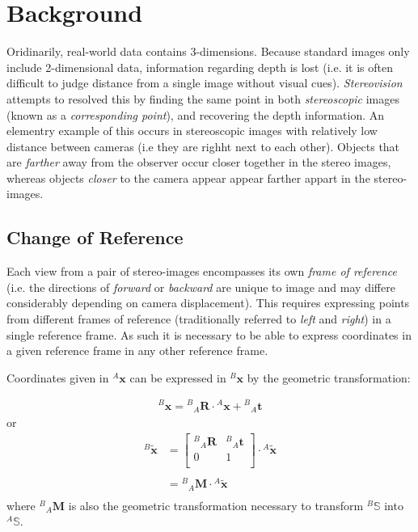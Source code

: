 \documentclass[12pt]{report}
\newcommand{\tR}[0]{\ensuremath{^{A}}}
\newcommand{\bR}[0]{\ensuremath{_{A}}}
\newcommand{\tL}[0]{\ensuremath{^{B}}}
\newcommand{\rL}[0]{\ensuremath{{\tL\bR}}}
\newcommand{\xL}[0]{\ensuremath{{\tL\mathbf{x}}}}
\newcommand{\xR}[0]{\ensuremath{{\tR\mathbf{x}}}}
\newcommand{\hxL}[0]{\ensuremath{{\tL\tilde{\mathbf{x}}}}}
\newcommand{\hxR}[0]{\ensuremath{{\tR\tilde{\mathbf{x}}}}}
\newcommand{\rLM}[0]{\ensuremath{{\tL\bR}\mathbf{M}}}
\newcommand{\rLR}[0]{\ensuremath{{\tL\bR}\mathbf{R}}}
\newcommand{\rLt}[0]{\ensuremath{{\tL\bR}\mathbf{t}}}
\newcommand{\sR}[0]{\ensuremath{^{A}\mathbb{S}}}
\newcommand{\sL}[0]{\ensuremath{^{B}\mathbb{S}}}
\begin{document}
\chapter{Background}

\par Oridinarily, real-world data contains 3-dimensions. 
Because standard images only include 2-dimensional data, information regarding depth is lost (i.e. it is often difficult to judge distance from a single image without visual cues). 
\textit{Stereovision} attempts to resolved this by finding the same point in both \textit{stereoscopic} images (known as a \textit{corresponding point}), and recovering the depth information.
An elementry example of this occurs in stereoscopic images with relatively low distance between cameras (i.e they are righht next to each other). 
Objects that are \textit{farther} away from the observer occur closer together in the stereo images, whereas objects \textit{closer} to the camera appear appear farther appart in the stereo-images.

\section{Change of Reference}

\par Each view from a pair of stereo-images encompasses its own \textit{frame of reference} (i.e. the directions of \textit{forward} or \textit{backward} are unique to image and may differe considerably depending on camera displacement).
This requires expressing points from different frames of reference (traditionally referred to \textit{left} and \textit{right}) in a single reference frame. 
As such it is necessary to be able to express coordinates in a given reference frame in any other reference frame.

\par Coordinates given in $\xR$ can be expressed in $\xL$ by the geometric transformation:
\renewcommand{\arraystretch}{1.5}
\par
\begin{align*}
	\xL = \rLR \cdot \xR + \rLt
\end{align*}
or
\begin{align*}
	\hxL &=
	\left[\begin{array}{c|c}
		\rL\textbf{R} & \rL\textbf{t} \\\hline
		0 & 1 \\
	\end{array}\right]
	\cdot\hxR \\
	&\\
	&= \rLM\cdot\hxR\\
\end{align*}
where $\rLM$ is also the geometric transformation necessary to transform $\sL$ into $\sR$. 
\end{document}
